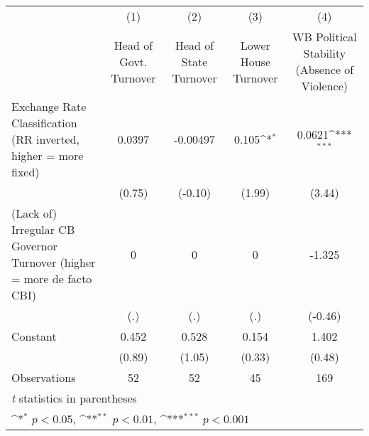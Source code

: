 {
\def\sym#1{\ifmmode^{#1}\else\(^{#1}\)\fi}
\begin{tabular}{l*{4}{c}}
\hline\hline
                &\multicolumn{1}{c}{(1)}&\multicolumn{1}{c}{(2)}&\multicolumn{1}{c}{(3)}&\multicolumn{1}{c}{(4)}\\
                &\multicolumn{1}{c}{Head of Govt. Turnover}&\multicolumn{1}{c}{Head of State Turnover}&\multicolumn{1}{c}{Lower House Turnover}&\multicolumn{1}{c}{WB Political Stability (Absence of Violence)}\\
\hline
Exchange Rate Classification (RR inverted, higher = more fixed)&   0.0397         & -0.00497         &    0.105\sym{*}  &   0.0621\sym{***}\\
                &   (0.75)         &  (-0.10)         &   (1.99)         &   (3.44)         \\
[1em]
(Lack of) Irregular CB Governor Turnover (higher = more de facto CBI)&        0         &        0         &        0         &   -1.325         \\
                &      (.)         &      (.)         &      (.)         &  (-0.46)         \\
[1em]
Constant        &    0.452         &    0.528         &    0.154         &    1.402         \\
                &   (0.89)         &   (1.05)         &   (0.33)         &   (0.48)         \\
\hline
Observations    &       52         &       52         &       45         &      169         \\
\hline\hline
\multicolumn{5}{l}{\footnotesize \textit{t} statistics in parentheses}\\
\multicolumn{5}{l}{\footnotesize \sym{*} \(p<0.05\), \sym{**} \(p<0.01\), \sym{***} \(p<0.001\)}\\
\end{tabular}
}
